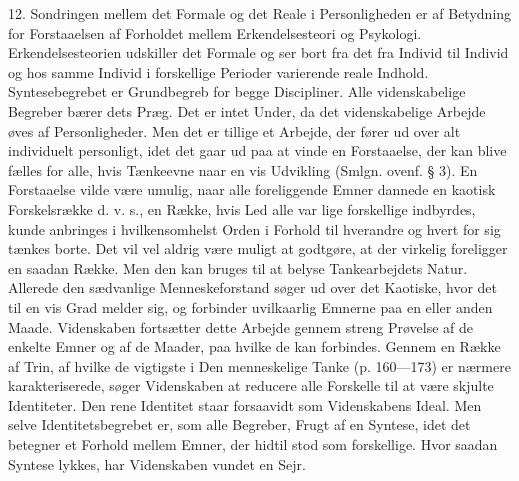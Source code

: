 \documentclass[12pt]{article}
\newcommand{\opage}[1]{\marginnote{\footnotesize\textit{[#1]}}}
\begin{document}
12. Sondringen mellem det Formale og det Reale i Personligheden er af
Betydning for Forstaaelsen af Forholdet mellem Erkendelsesteori og
Psykologi. Erkendelsesteorien
\opage{41}udskiller det Formale og ser bort fra det fra Individ til
Individ og hos samme Individ i forskellige Perioder varierende reale
Indhold. Syntesebegrebet er Grundbegreb for begge Discipliner. Alle
videnskabelige Begreber bærer dets Præg. Det er intet Under, da det
videnskabelige Arbejde øves af Personligheder. Men det er tillige et
Arbejde, der fører ud over alt individuelt personligt, idet det gaar
ud paa at vinde en Forstaaelse, der kan blive fælles for alle, hvis
Tænkeevne naar en vis Udvikling (Smlgn. ovenf. § 3). En Forstaaelse
vilde være umulig, naar alle foreliggende Emner dannede en kaotisk
Forskelsrække d. v. s., en Række, hvis Led alle var lige forskellige
indbyrdes, kunde anbringes i hvilkensomhelst Orden i Forhold til
hverandre og hvert for sig tænkes borte. Det vil vel aldrig være
muligt at godtgøre, at der virkelig foreligger en saadan Række. Men den
kan bruges til at belyse Tankearbejdets Natur. Allerede den sædvanlige
Menneskeforstand søger ud over det Kaotiske, hvor det til en vis Grad
melder sig, og forbinder uvilkaarlig Emnerne paa en eller anden Maade.
Videnskaben fortsætter dette Arbejde gennem streng Prøvelse af de
enkelte Emner og af de Maader, paa hvilke de kan forbindes. Gennem en
Række af Trin, af hvilke de vigtigste i \guillemotright{}Den menneskelige
Tanke\guillemotleft{} (p. 160---173) er nærmere karakteriserede, søger
Videnskaben at reducere alle Forskelle til at være skjulte
Identiteter. Den rene Identitet staar forsaavidt som Videnskabens
Ideal. Men selve Identitetsbegrebet er, som alle Begreber, Frugt af en
Syntese, idet det betegner et Forhold mellem Emner, der hidtil stod
som forskellige. Hvor saadan Syntese lykkes, har Videnskaben vundet en
Sejr.
\end{document}
